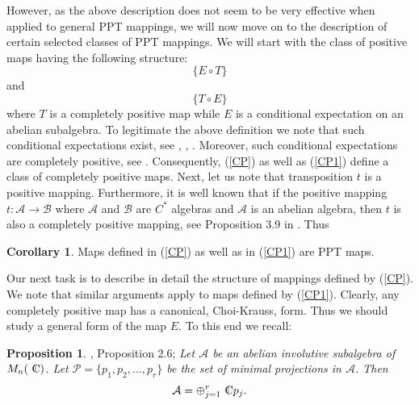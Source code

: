 \documentclass{amsart}
\theoremstyle{plain}
\theoremstyle{definition}
\newtheorem{prop}[thm]{Proposition}
\newtheorem{cor}[thm]{Corollary}
\newcommand{\cA}{\mathcal{A}}
\newcommand{\cB}{\mathcal{B}}
\newcommand{\cP}{\mathcal{P}}
\newcommand{\Cn}{{\setbox0=\hbox{
$\displaystyle\rm C$}\hbox{\hbox
to0pt{\kern0.6\wd0\vrule height0.9\ht0\hss}\box0}}} %
\begin{document}
However, as the above description does not seem to be very effective when applied to general PPT mappings, we will now move on to the description of 
certain selected classes of PPT mappings.  We will start with the class of positive maps having the following structure:
\begin{equation}
\label{CP}
\{ E \circ T \}
\end{equation}
and
\begin{equation}
\label{CP1}
\{ T\circ E \}
\end{equation}
where $T$ is a completely positive map while $E$ is a conditional expectation on an abelian subalgebra. To legitimate the above definition
we note that such conditional expectations exist, see \cite{Nak}, \cite{Tak}, \cite{Kad}. Moreover, such conditional expectations are completely positive, see \cite{Ster}. Consequently,  (\ref{CP}) as well as (\ref{CP1}) define a class of completely positive maps. Next, let us note that transposition $t$ is a positive mapping. Furthermore, it is well known that if the positive mapping $t: \cA \to \cB$ where $\cA$ and $\cB$ are $C^*$  algebras and $\cA$ is an abelian algebra, then $t$ is also a completely positive mapping, see Proposition 3.9 in \cite{Tak}. Thus
\begin{cor}
Maps defined in (\ref{CP}) as well as in  (\ref{CP1}) are PPT maps.
\end{cor}
Our next task is to describe in detail the structure of  mappings defined by (\ref{CP}). We note that similar arguments apply to maps defined by (\ref{CP1}). Clearly, any completely positive map has a canonical, Choi-Krauss, form. Thus we should study a general form of the map $E$. To this end we recall:
\begin{prop}
\cite{HJ}, Proposition 2.6;
\textit{Let $\cA$ be an abelian involutive subalgebra of $M_n(\Cn)$. Let $\cP = \{p_1,p_2,...,p_r\}$ be the set of minimal projections in $\cA$. Then}
$$\cA = \oplus_{j=1}^r \Cn p_j.$$
\end{prop}
\end{document}
